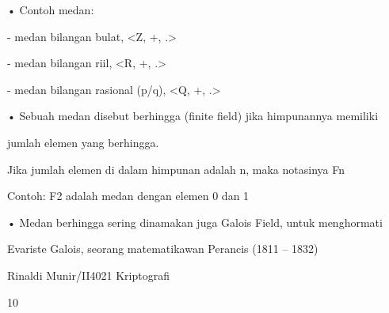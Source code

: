 \documentclass{article}
\begin{document}

• Contoh medan: 

 - medan bilangan bulat, <Z, +, .>

 - medan bilangan riil, <R, +, .>

 - medan bilangan rasional (p/q),  <Q, +, .>

• Sebuah medan disebut berhingga (finite field) jika himpunannya memiliki 

jumlah elemen yang berhingga. 

 Jika jumlah elemen di dalam himpunan adalah n, maka notasinya Fn

 Contoh: F2 adalah medan dengan elemen 0 dan 1

• Medan berhingga sering dinamakan juga Galois Field, untuk menghormati 

Evariste Galois, seorang matematikawan Perancis (1811 – 1832)

Rinaldi Munir/II4021 Kriptografi

10
\end{document}
